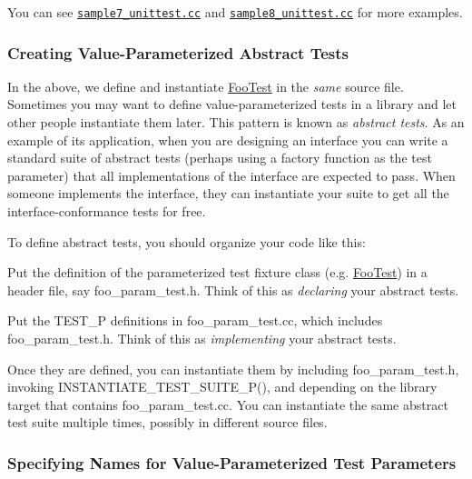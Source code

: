 You can see \href{https://github.com/google/googletest/blob/main/googletest/samples/sample7_unittest.cc}{\tt sample7\+\_\+unittest.\+cc} and \href{https://github.com/google/googletest/blob/main/googletest/samples/sample8_unittest.cc}{\tt sample8\+\_\+unittest.\+cc} for more examples.

\subsubsection*{Creating Value-\/\+Parameterized Abstract Tests}

In the above, we define and instantiate {\ttfamily \mbox{\hyperlink{classFooTest}{Foo\+Test}}} in the {\itshape same} source file. Sometimes you may want to define value-\/parameterized tests in a library and let other people instantiate them later. This pattern is known as {\itshape abstract tests}. As an example of its application, when you are designing an interface you can write a standard suite of abstract tests (perhaps using a factory function as the test parameter) that all implementations of the interface are expected to pass. When someone implements the interface, they can instantiate your suite to get all the interface-\/conformance tests for free.

To define abstract tests, you should organize your code like this\+:


\begin{DoxyEnumerate}
\item Put the definition of the parameterized test fixture class (e.\+g. {\ttfamily \mbox{\hyperlink{classFooTest}{Foo\+Test}}}) in a header file, say {\ttfamily foo\+\_\+param\+\_\+test.\+h}. Think of this as {\itshape declaring} your abstract tests.
\item Put the {\ttfamily T\+E\+S\+T\+\_\+P} definitions in {\ttfamily foo\+\_\+param\+\_\+test.\+cc}, which includes {\ttfamily foo\+\_\+param\+\_\+test.\+h}. Think of this as {\itshape implementing} your abstract tests.
\end{DoxyEnumerate}

Once they are defined, you can instantiate them by including {\ttfamily foo\+\_\+param\+\_\+test.\+h}, invoking {\ttfamily I\+N\+S\+T\+A\+N\+T\+I\+A\+T\+E\+\_\+\+T\+E\+S\+T\+\_\+\+S\+U\+I\+T\+E\+\_\+\+P()}, and depending on the library target that contains {\ttfamily foo\+\_\+param\+\_\+test.\+cc}. You can instantiate the same abstract test suite multiple times, possibly in different source files.

\subsubsection*{Specifying Names for Value-\/\+Parameterized Test Parameters}

